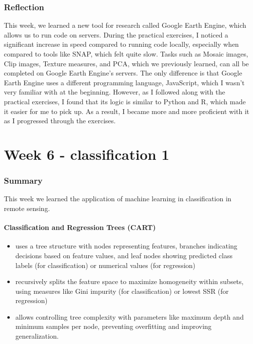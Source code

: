 \documentclass[
  letterpaper,
  DIV=11,
  numbers=noendperiod]{scrreprt}
\providecommand{\tightlist}{%
  \setlength{\itemsep}{0pt}\setlength{\parskip}{0pt}}\usepackage{longtable,booktabs,array}
\begin{document}
\hypertarget{reflection-2}{%
\subsection{Reflection}\label{reflection-2}}

This week, we learned a new tool for research called Google Earth
Engine, which allows us to run code on servers. During the practical
exercises, I noticed a significant increase in speed compared to running
code locally, especially when compared to tools like SNAP, which felt
quite slow. Tasks such as Mosaic images, Clip images, Texture measures,
and PCA, which we previously learned, can all be completed on Google
Earth Engine's servers. The only difference is that Google Earth Engine
uses a different programming language, JavaScript, which I wasn't very
familiar with at the beginning. However, as I followed along with the
practical exercises, I found that its logic is similar to Python and R,
which made it easier for me to pick up. As a result, I became more and
more proficient with it as I progressed through the exercises.


\hypertarget{week-6---classification-1}{%
\chapter{Week 6 - classification 1}\label{week-6---classification-1}}

\hypertarget{summary-3}{%
\subsection{Summary}\label{summary-3}}

This week we learned the application of machine learning in
classification in remote sensing.

\hypertarget{classification-and-regression-trees-cart}{%
\subsubsection{Classification and Regression Trees
(CART)}\label{classification-and-regression-trees-cart}}

\begin{itemize}
\tightlist
\item
  uses a tree structure with nodes representing features, branches
  indicating decisions based on feature values, and leaf nodes showing
  predicted class labels (for classification) or numerical values (for
  regression)
\item
  recursively splits the feature space to maximize homogeneity within
  subsets, using measures like Gini impurity (for classification) or
  lowest SSR (for regression)
\item
  allows controlling tree complexity with parameters like maximum depth
  and minimum samples per node, preventing overfitting and improving
  generalization.
\end{itemize}
\end{document}
